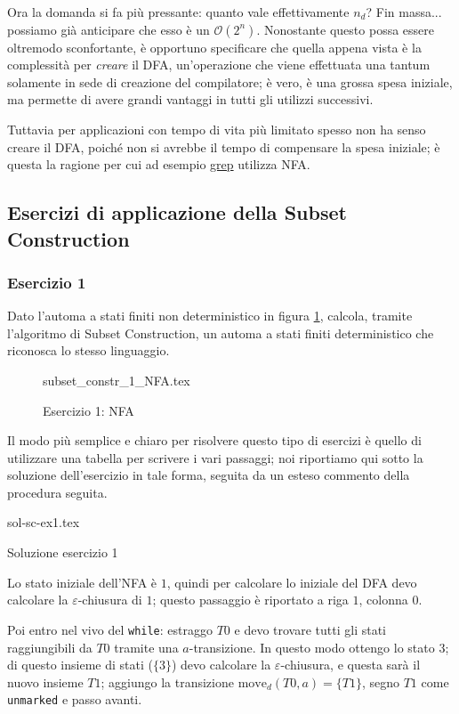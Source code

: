 \documentclass[class=book, crop=false, oneside, 12pt]{standalone}
\begin{document}
Ora la domanda si fa più pressante: quanto vale effettivamente \(n_d\)?
Fin massa... possiamo già anticipare che esso è un \(\mathcal{O}(2^n)\). Nonostante questo possa essere oltremodo sconfortante, è opportuno specificare che quella appena vista è la complessità per \emph{creare} il DFA, un'operazione che viene effettuata una tantum solamente in sede di creazione del compilatore; è vero, è una grossa spesa iniziale, ma permette di avere grandi vantaggi in tutti gli utilizzi successivi.

Tuttavia per applicazioni con tempo di vita più limitato spesso non ha senso creare il DFA, poiché non si avrebbe il tempo di compensare la spesa iniziale; è questa la ragione per cui ad esempio \href{https://it.wikipedia.org/wiki/Grep}{grep} utilizza NFA.


\subsection{Esercizi di applicazione della Subset Construction}
\subsubsection*{Esercizio 1}
Dato l'automa a stati finiti non deterministico in figura \ref{es_sc_1}, calcola, tramite l'algoritmo di Subset Construction, un automa a stati finiti deterministico che riconosca lo stesso linguaggio.
\begin{figure}[H]
    \centering
    {subset_constr_1_NFA.tex}
    \caption{Esercizio 1: NFA}
    \label{es_sc_1}
\end{figure}

Il modo più semplice e chiaro per risolvere questo tipo di esercizi è quello di utilizzare una tabella per scrivere i vari passaggi; noi riportiamo qui sotto la soluzione dell'esercizio in tale forma, seguita da un esteso commento della procedura seguita.
\begin{table}[H]
	\centering
	{sol-sc-ex1.tex}
    \caption{Soluzione esercizio 1}
    \label{sol-sc-ex1}
\end{table} 
Lo stato iniziale dell'NFA è \(1\), quindi per calcolare lo iniziale del DFA devo calcolare la \(\varepsilon\)-chiusura di \(1\); questo passaggio è riportato a riga \(1\), colonna \(0\).

Poi entro nel vivo del \texttt{while}: estraggo \(T0\) e devo trovare tutti gli stati raggiungibili da \(T0\) tramite una \(a\)-transizione. In questo modo ottengo lo stato \(3\); di questo insieme di stati (\(\{3\}\)) devo calcolare la \(\varepsilon\)-chiusura, e questa sarà il nuovo insieme \(T1\); aggiungo la transizione \(\textrm{move}_d(T0, a)=\{T1\}\), segno \(T1\) come \texttt{unmarked} e passo avanti.
\end{document}
